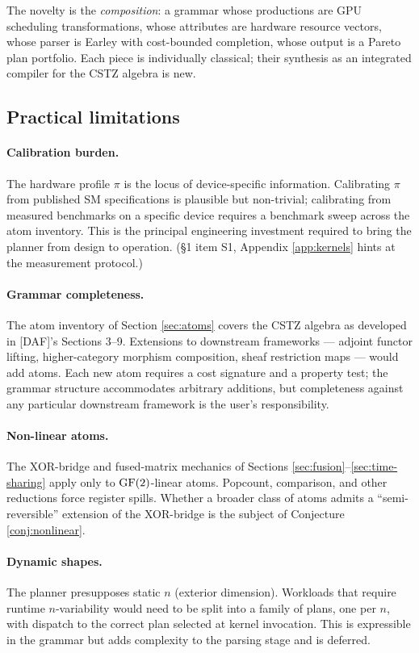 The novelty is the \emph{composition}: a grammar
whose productions are GPU scheduling
transformations, whose attributes are hardware
resource vectors, whose parser is Earley with
cost-bounded completion, whose output is a Pareto
plan portfolio. Each piece is individually classical;
their synthesis as an integrated compiler for the
CSTZ algebra is new.

\subsection{Practical limitations}

\paragraph{Calibration burden.} The hardware profile
$\pi$ is the locus of device-specific information.
Calibrating $\pi$ from published SM specifications
is plausible but non-trivial; calibrating from
measured benchmarks on a specific device requires a
benchmark sweep across the atom inventory. This is
the principal engineering investment required to
bring the planner from design to operation.
(\S1 item S1, Appendix \ref{app:kernels} hints at
the measurement protocol.)

\paragraph{Grammar completeness.} The atom inventory
of Section \ref{sec:atoms} covers the CSTZ algebra
as developed in [DAF]'s Sections 3--9. Extensions to
downstream frameworks --- adjoint functor lifting,
higher-category morphism composition, sheaf
restriction maps --- would add atoms. Each new
atom requires a cost signature and a property test;
the grammar structure accommodates arbitrary
additions, but completeness against any particular
downstream framework is the user's responsibility.

\paragraph{Non-linear atoms.} The XOR-bridge and
fused-matrix mechanics of Sections
\ref{sec:fusion}--\ref{sec:time-sharing} apply only
to $\operatorname{GF}(2)$-linear atoms. Popcount, comparison,
and other reductions force register spills. Whether
a broader class of atoms admits a ``semi-reversible''
extension of the XOR-bridge is the subject of
Conjecture \ref{conj:nonlinear}.

\paragraph{Dynamic shapes.} The planner presupposes
static $n$ (exterior dimension). Workloads that
require runtime $n$-variability would need to be
split into a family of plans, one per $n$, with
dispatch to the correct plan selected at kernel
invocation. This is expressible in the grammar but
adds complexity to the parsing stage and is deferred.

